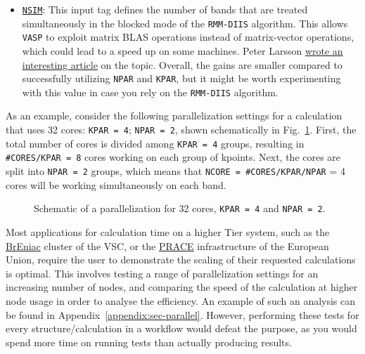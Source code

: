 \begin{refsection}
\begin{itemize}
\item \href{https://cms.mpi.univie.ac.at/wiki/index.php/NSIM}{\texttt{NSIM}}: 
This input tag defines the number of bands that are treated simultaneously in 
the blocked mode of the \texttt{RMM-DIIS} algorithm. This allows \texttt{VASP} 
to exploit matrix BLAS operations instead of matrix-vector operations, which 
could lead to a speed up on some machines. Peter Larsson 
\href{https://www.nsc.liu.se/~pla/blog/2012/02/22/nparnsim/}{wrote an 
interesting article} on the topic. Overall, the gains are smaller compared to 
successfully utilizing \verb|NPAR| and \verb|KPAR|, but it might be worth 
experimenting with this value in case you rely on the \texttt{RMM-DIIS} 
algorithm. 
 
\end{itemize} 
 
As an example, consider the following parallelization settings for a 
calculation that uses 32 cores: \texttt{KPAR = 4}; \texttt{NPAR = 2}, shown 
schematically in Fig.~\ref{automation:fig-parallel}. First, the total number 
of cores is divided among \texttt{KPAR = 4} groups, resulting in 
\texttt{\#CORES/KPAR = 8} cores working on each group of kpoints. Next, the 
cores are split into \texttt{NPAR = 2} groups, which means that \texttt{NCORE 
= \#CORES/KPAR/NPAR} = 4 cores will be working simultaneously on each band. 
 
\begin{figure}[hb] 
\centering 
 
\caption{Schematic of a parallelization for 32 cores, \texttt{KPAR = 4}  and 
\texttt{NPAR = 2}.} 
\label{automation:fig-parallel} 
\end{figure} 
 
Most applications for calculation time on a higher Tier system, such as the 
\href{https://www.vscentrum.be/tier1}{BrEniac} cluster of the VSC, or the 
\href{http://www.prace-ri.eu/}{PRACE} infrastructure of the European Union, 
require the user to demonstrate the scaling of their requested calculations is 
optimal. This involves testing a range of parallelization settings for an 
increasing number of nodes, and comparing the speed of the calculation at 
higher node usage in order to analyse the efficiency. An example of such an 
analysis can be found in Appendix~\ref{appendix:sec-parallel}. However, 
performing these tests for every structure/calculation in a workflow would 
defeat the purpose, as you would spend more time on running tests than 
actually producing results.  
 

\end{refsection}

